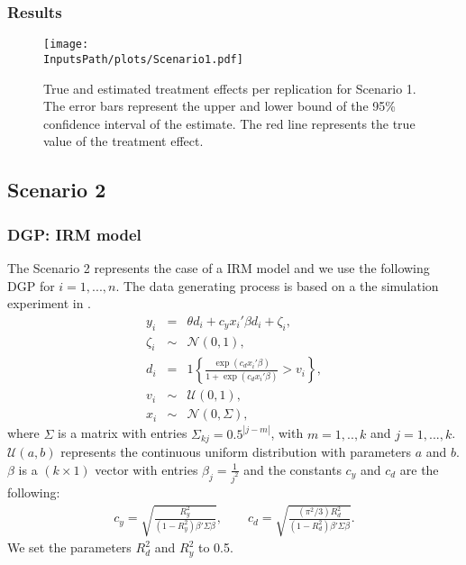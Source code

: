 \documentclass[10pt]{article}
\newcommand*{\InputsFolderPath}{C:/DEV/DML/src/data/}
\newcommand*{\InputsPath}{\InputsFolderPath/20221103}
\begin{document}
\subsubsection{Results}

\begin{figure}[H]
	\begin{center}
		\texttt{[image: \\InputsPath/plots/Scenario1.pdf]}
		\caption{True and estimated treatment effects per replication for Scenario 1. The error bars represent the upper and lower bound of the 95\% confidence interval of the estimate. The red line represents the true value of the treatment effect.}
		\label{Scenario 1}
	\end{center}
\end{figure}



\subsection{Scenario 2}
\subsubsection{DGP: IRM model}
The Scenario 2 represents the case of a IRM model and we use the following DGP for $i=1,...,n$.
The data generating process is based on a the simulation experiment in \cite{Bell2017}.
\begin{eqnarray*}\label{dgp_3.1}
	y_i &=& \theta d_i + c_y x_i' \beta d_i + \zeta_i, \\
	\zeta_i &\sim& \mathcal{N}(0,1), \\	
	d_i &=& 1\left\lbrace \frac{\exp(c_d x_i' \beta)}{1+\exp(c_d x_i' \beta)} > v_i \right\rbrace, \\
	v_i
	&\sim& \mathcal{U}(0,1),\\
	x_i &\sim& \mathcal{N}(0, \Sigma),
\end{eqnarray*}
where $\Sigma$ is a matrix with entries $\Sigma_{kj} = 0.5^{|j-m|}$, with $m=1,..,k$ and $j=1,...,k$.
$\mathcal{U}(a,b)$ represents the continuous uniform distribution with parameters $a$ and $b$.
$\beta$ is a $(k\times 1)$ vector with entries $\beta_j=\frac{1}{j^2}$ and the constants $c_y$ and $c_d$ are the following:
\begin{eqnarray*}\label{dgp_3.2}
	c_y = \sqrt{\frac{R_y^2}{(1-R_y^2) \beta' \Sigma \beta}}, \qquad 
	c_d =\sqrt{\frac{(\pi^2 /3) R_d^2}{(1-R_d^2) \beta' \Sigma \beta}}.
\end{eqnarray*}
We set the parameters $R^2_d$ and $R^2_y$ to 0.5.
\end{document}
